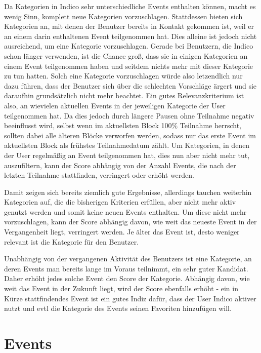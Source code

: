 Da Kategorien in Indico sehr unterschiedliche Events enthalten können, macht es wenig Sinn, komplett
neue Kategorien vorzuschlagen. Stattdessen bieten sich Kategorien an, mit denen der Benutzer bereits
in Kontakt gekommen ist, weil er an einem darin enthaltenen Event teilgenommen hat. Dies alleine ist
jedoch nicht ausreichend, um eine Kategorie vorzuschlagen. Gerade bei Benutzern, die Indico schon
länger verwenden, ist die Chance groß, dass sie in einigen Kategorien an einem Event teilgenommen
haben und seitdem nichts mehr mit dieser Kategorie zu tun hatten. Solch eine Kategorie vorzuschlagen
würde also letzendlich nur dazu führen, dass der Benutzer sich über die schlechten Vorschläge ärgert
und sie daraufhin grundsätzlich nicht mehr beachtet. Ein gutes Relevanzkriterium ist also, an
wievielen aktuellen Events in der jeweiligen Kategorie der User teilgenommen hat. Da dies jedoch
durch längere Pausen ohne Teilnahme negativ beeinflusst wird, selbst wenn im aktuellsten Block 100\%
Teilnahme herrscht, sollten dabei alle älteren Blöcke verworfen werden, sodass nur das erste Event
im aktuellsten Block als frühstes Teilnahmedatum zählt. Um Kategorien, in denen der User regelmäßig
an Event teilgenommen hat, dies nun aber nicht mehr tut, auszufiltern, kann der Score abhängig von
der Anzahl Events, die nach der letzten Teilnahme stattfinden, verringert oder erhöht werden.

Damit zeigen sich bereits ziemlich gute Ergebnisse, allerdings tauchen weiterhin Kategorien auf, die
die bisherigen Kriterien erfüllen, aber nicht mehr aktiv genutzt werden und somit keine neuen Events
enthalten. Um diese nicht mehr vorzuschlagen, kann der Score abhängig davon, wie weit das neueste
Event in der Vergangenheit liegt, verringert werden. Je älter das Event ist, desto weniger relevant
ist die Kategorie für den Benutzer.

Unabhängig von der vergangenen Aktivität des Benutzers ist eine Kategorie, an deren Events man
bereits lange im Voraus teilnimmt, ein sehr guter Kandidat. Daher erhöht jedes solche Event den
Score der Kategorie. Abhängig davon, wie weit das Event in der Zukunft liegt, wird der Score
ebenfalls erhöht - ein in Kürze stattfindendes Event ist ein gutes Indiz dafür, dass der User Indico
aktiver nutzt und evtl die Kategorie des Events seinen Favoriten hinzufügen will.


\section{Events}

